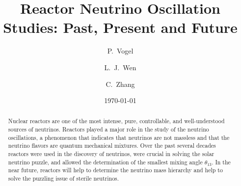 \documentclass[aps,twocolumn,preprintnumbers,amsmath,superscriptaddress,amssymb,floats,nofootinbib]{revtex4-1}
\begin{document}
\title{Reactor Neutrino Oscillation Studies: Past, Present and Future}
\date{\today}
\author{P.~Vogel}
\author{L.~J.~Wen}
\author{C.~Zhang}


\begin{abstract}
Nuclear reactors are one of the most intense, pure, controllable, and well-understood sources of neutrinos. Reactors played a major role in the study of the neutrino oscillations, a phenomenon that indicates that neutrinos are not massless and that the neutrino flavors are quantum mechanical mixtures. Over the past several decades reactors were used in the discovery of neutrinos, were crucial in solving the solar neutrino puzzle, and allowed the determination of the smallest mixing angle $\theta_{13}$. In the near future, reactors will help to determine the neutrino mass hierarchy and help to solve the puzzling issue of sterile neutrinos.
\end{abstract}

\maketitle
\thispagestyle{plain}









%


\end{document}
